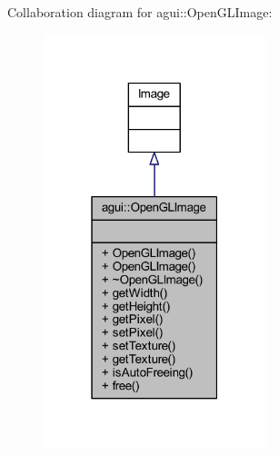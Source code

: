 Collaboration diagram for agui\+:\+:Open\+G\+L\+Image\+:
\nopagebreak
\begin{figure}[H]
\begin{center}
\leavevmode
\includegraphics[width=183pt]{classagui_1_1_open_g_l_image__coll__graph}
\end{center}
\end{figure}
